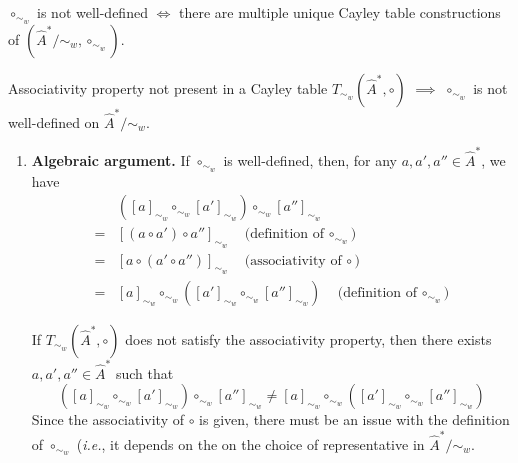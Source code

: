 \begin{corollary}
    $\circ_{\sim_{w}}$ is not well-defined $\iff$ there are multiple unique Cayley table constructions of $(\hat{A}^{*}/\sim_{w}, \circ_{\sim_{w}})$.
\end{corollary}


\begin{propositionE}
    Associativity property not present in a Cayley table $T_{\sim_{w}}(\hat{A}^{*}, \circ)$ $\implies$ $\circ_{\sim_{w}}$ is not well-defined on $\hat{A}^{*}/\sim_{w}$.
\end{propositionE}
\begin{proofE}
\begin{enumerate}[(1)]
    \item \textbf{Algebraic argument.}
    If $\circ_{\sim_{w}}$ is well-defined, then, for any $a, a', a'' \in \hat{A}^{*}$, we have
    \begin{align}
          & ([a]_{\sim_{w}} \circ_{\sim_{w}} [a']_{\sim_{w}}) \circ_{\sim_{w}} [a'']_{\sim_{w}} \\
        = & [(a \circ a') \circ a'']_{\sim_{w}} \quad \text{(definition of $\circ_{\sim_{w}}$}) \\
        = & [a \circ (a' \circ a'')]_{\sim_{w}} \quad \text{(associativity of $\circ$}) \\
        = & [a]_{\sim_{w}} \circ_{\sim_{w}} ([a']_{\sim_{w}} \circ_{\sim_{w}} [a'']_{\sim_{w}}) \quad \text{(definition of $\circ_{\sim_{w}}$})
    \end{align}

    If $T_{\sim_{w}}(\hat{A}^{*}, \circ)$ does not satisfy the associativity property, then there exists $a, a', a'' \in \hat{A}^{*}$ such that
    \begin{equation}
        ([a]_{\sim_{w}} \circ_{\sim_{w}} [a']_{\sim_{w}}) \circ_{\sim_{w}} [a'']_{\sim_{w}} \neq [a]_{\sim_{w}} \circ_{\sim_{w}} ([a']_{\sim_{w}} \circ_{\sim_{w}} [a'']_{\sim_{w}})
    \end{equation}
    Since the associativity of $\circ$ is given, there must be an issue with the definition of $\circ_{\sim_{w}}$ (\textit{i.e.}, it depends on the on the choice of representative in $\hat{A}^{*}/\sim_{w}$.
    

\end{enumerate}
\end{proofE}
